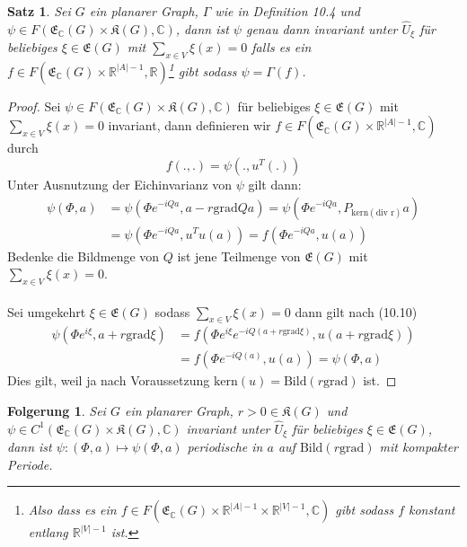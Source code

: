 \documentclass[11pt,a4paper,leqno]{report}
\newtheorem{proposition}{Satz}[chapter]
\newtheorem{corollary}[theorem]{Folgerung}
\numberwithin{equation}{chapter}
\begin{document}
\begin{proposition}
	Sei $G$ ein planarer Graph, $\Gamma$ wie in Definition 10.4 und $\psi\in F(\mathfrak{E}_\mathbb{C}(G)\times\mathfrak{K}(G), \mathbb{C})$, dann ist $\psi$ genau dann invariant unter $\hat{U}_\xi$ f\"ur beliebiges $\xi\in\mathfrak{E}(G)$ mit $\sum_{x\in V}\xi(x)=0$ falls es ein $f\in F(\mathfrak{E}_\mathbb{C}(G)\times\mathbb{R}^{|A|-1}, \mathbb{R})$\footnote{Also dass es ein $f\in F(\mathfrak{E}_\mathbb{C}(G)\times\mathbb{R}^{|A|-1}\times\mathbb{R}^{|V|-1}, \mathbb{C})$ gibt sodass $f$ konstant entlang $\mathbb{R}^{|V|-1}$ ist.} gibt sodass $\psi=\Gamma(f)$.
\end{proposition}
\begin{proof}
Sei $\psi\in F(\mathfrak{E}_\mathbb{C}(G)\times\mathfrak{K}(G), \mathbb{C})$ f\"ur beliebiges $\xi\in\mathfrak{E}(G)$ mit $\sum_{x\in V}\xi(x)=0$ invariant, dann definieren wir $f\in F(\mathfrak{E}_\mathbb{C}(G)\times\mathbb{R}^{|A|-1}, \mathbb{C})$ durch 
\begin{equation*}
	f(.,.) = \psi(.,u^T(.))
\end{equation*}
Unter Ausnutzung der Eichinvarianz von $\psi$ gilt dann:
\begin{align*}
	\psi(\Phi, a) &= \psi(\Phi e^{-iQa}, a-r\text{grad}Qa)=\psi(\Phi e^{-iQa}, P_{\text{kern}(\text{div r})}a)\\&=\psi(\Phi e^{-iQa}, u^Tu(a))
	=f(\Phi e^{-iQa}, u(a))
\end{align*}
Bedenke die Bildmenge von $Q$ ist jene Teilmenge von $\mathfrak{E}(G)$ mit $\sum_{x\in V}\xi(x)=0$.\\
\\
Sei umgekehrt $\xi\in\mathfrak{E}(G)$ sodass $\sum_{x\in V}\xi(x)=0$ dann gilt nach (10.10)
\begin{align*}
	\psi(\Phi e^{i\xi}, a + r\text{grad}\xi) &= f(\Phi e^{i\xi} e^{-iQ(a + r\text{grad}\xi)}, u(a + r\text{grad}\xi))\\&=f(\Phi e^{-iQ(a )}, u(a))=\psi(\Phi, a)
\end{align*}
Dies gilt, weil ja nach Voraussetzung $\text{kern}(u)=\text{Bild}(r\text{grad})$ ist.
\end{proof}
\noindent
\begin{corollary}
	Sei $G$ ein planarer Graph, $r>0\in\mathfrak{K}(G)$ und $\psi\in C^1(\mathfrak{E}_\mathbb{C}(G)\times\mathfrak{K}(G), \mathbb{C})$ invariant unter $\hat{U}_\xi$ f\"ur beliebiges $\xi\in\mathfrak{E}(G)$, dann ist $\psi:(\Phi,a)\mapsto\psi(\Phi, a)$ periodische in $a$ auf $\text{Bild}(r\text{grad})$ mit kompakter Periode.
\end{corollary}
\end{document}
